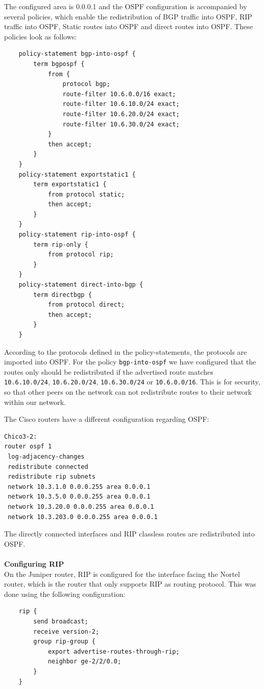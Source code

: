 \documentclass[10pt,a4paper]{article}
\begin{document}
The configured area is 0.0.0.1 and the OSPF configuration is accompanied by several policies, which enable the redistribution of BGP traffic into OSPF, RIP traffic into OSPF, Static routes into OSPF and direct routes into OSPF. These policies look as follows:
\begin{verbatim}
    policy-statement bgp-into-ospf {
        term bgpospf {
            from {
                protocol bgp;
                route-filter 10.6.0.0/16 exact;
                route-filter 10.6.10.0/24 exact;
                route-filter 10.6.20.0/24 exact;
                route-filter 10.6.30.0/24 exact;
            }
            then accept;
        }                               
    }
    policy-statement exportstatic1 {
        term exportstatic1 {
            from protocol static;
            then accept;
        }
    }
    policy-statement rip-into-ospf {
        term rip-only {
            from protocol rip;
        }
    }
    policy-statement direct-into-bgp {
        term directbgp {
            from protocol direct;
            then accept;
        }
    }

\end{verbatim}
According to the protocols defined in the policy-statements, the protocols are imported into OSPF. For the policy \texttt{bgp-into-ospf} we have configured that the routes only should be redistributed if the advertised route matches \texttt{10.6.10.0/24}, \texttt{10.6.20.0/24}, \texttt{10.6.30.0/24} or \texttt{10.6.0.0/16}. This is for security, so that other peers on the network can not redistribute routes to their network within our network.

The Cisco routers have a different configuration regarding OSPF:
\begin{verbatim}
Chico3-2:
router ospf 1
 log-adjacency-changes
 redistribute connected
 redistribute rip subnets
 network 10.3.1.0 0.0.0.255 area 0.0.0.1
 network 10.3.5.0 0.0.0.255 area 0.0.0.1
 network 10.3.20.0 0.0.0.255 area 0.0.0.1
 network 10.3.203.0 0.0.0.255 area 0.0.0.1

\end{verbatim}
The directly connected interfaces and RIP classless routes are redistributed into OSPF.
\\
\\
\textbf{Configuring RIP}\\
On the Juniper router, RIP is configured for the interface facing the Nortel router, which is the router that only supports RIP as routing protocol. This was done using the following configuration:
\begin{verbatim}
    rip {
        send broadcast;
        receive version-2;
        group rip-group {               
            export advertise-routes-through-rip;
            neighbor ge-2/2/0.0;
        }
    }

\end{verbatim}
\end{document}

